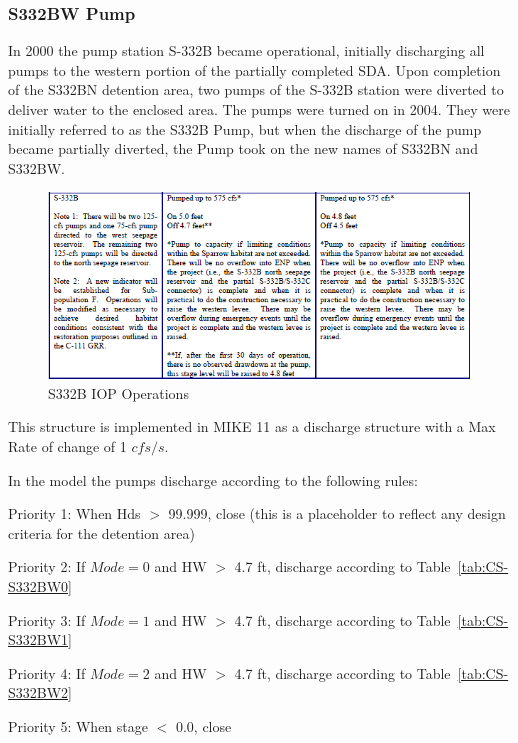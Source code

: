 \clearpage
\subsubsection{S332BW Pump}
In 2000 the pump station S-332B became operational, initially discharging all pumps to the western portion of the partially completed SDA.
Upon completion of the S332BN detention area, two pumps of the S-332B station were diverted to deliver water to the enclosed area.
The pumps were turned on in 2004. They were initially referred to as the S332B Pump, but when the discharge of the pump became partially diverted, the Pump took on the new names of S332BN and S332BW.

\begin{figure}[!h]
  \begin{center}
  \includegraphics[width=6.5in]{../figs/S332B_IOPops.png}
  \caption{S332B IOP Operations}
  \label{fig:S332BWiop}
  \end{center}
\end{figure}

This structure is implemented in MIKE 11 as a discharge structure with a Max Rate of change of 1 $cfs/s$.

In the model the pumps discharge according to the following rules:

\begin{packed_items}
\item Priority 1: When Hds $>$ 99.999, close (this is a placeholder to reflect any design criteria for the detention area)
\item Priority 2: If $Mode=0$ and HW $>$ 4.7 ft, discharge according to Table~\ref{tab:CS-S332BW0}
\item Priority 3: If $Mode=1$ and HW $>$ 4.7 ft, discharge according to Table~\ref{tab:CS-S332BW1}
\item Priority 4: If $Mode=2$ and HW $>$ 4.7 ft, discharge according to Table~\ref{tab:CS-S332BW2}
\item Priority 5: When stage $<$ 0.0, close
\end{packed_items}

